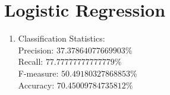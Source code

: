 \documentclass[12pt]{article}
\begin{document}
	
	
	\section{Logistic Regression}
	
	\begin{enumerate}
		
		\item Classification Statistics:\\
		
		Precision: $37.37864077669903\%$ \\
		Recall: $77.77777777777779\%$ \\
		F-measure: $50.49180327868853\%$ \\
		Accuracy: $70.45009784735812\%$ \\
		
		
	\end{enumerate}
	
\end{document}
